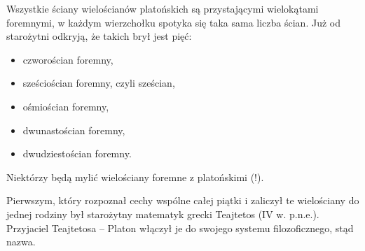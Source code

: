 %

Wszystkie ściany wielościanów platońskich są przystającymi wielokątami foremnymi, w każdym wierzchołku spotyka się taka sama liczba ścian.
Już od starożytni odkryją, że takich brył jest pięć:
\begin{itemize}
\item czworościan foremny,
\item sześciościan foremny, czyli sześcian,
\item ośmiościan foremny,
\item dwunastościan foremny,
\item dwudziestościan foremny.
\end{itemize}

Niektórzy będą mylić wielościany foremne z platońskimi (!).

Pierwszym, który rozpoznał cechy wspólne całej piątki i zaliczył te wielościany do jednej rodziny był starożytny matematyk grecki Teajtetos (IV w. p.n.e.). 
Przyjaciel Teajtetosa -- Platon włączył je do swojego systemu filozoficznego, stąd nazwa.


%